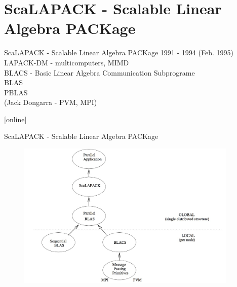 \section{ScaLAPACK - Scalable Linear Algebra PACKage}
	\begin{frame}{ScaLAPACK - Scalable Linear Algebra PACKage}
		1991 - 1994 (Feb. 1995) \\
		LAPACK-DM - multicomputers, MIMD \\
		\vspace{5mm}
		BLACS - Basic Linear Algebra Communication Subprograme \\ %
		BLAS \\
		PBLAS \\
		\vspace{5mm}
		(Jack Dongarra - PVM, MPI)
		\vspace{5mm}
		\begin{thebibliography}{9}
		\end{thebibliography}
	\end{frame}
	\begin{frame}{ScaLAPACK - Scalable Linear Algebra PACKage}
		\begin{figure}
			\includegraphics[height=7cm]{img/13/scalapack}
		\end{figure}
	\end{frame}
